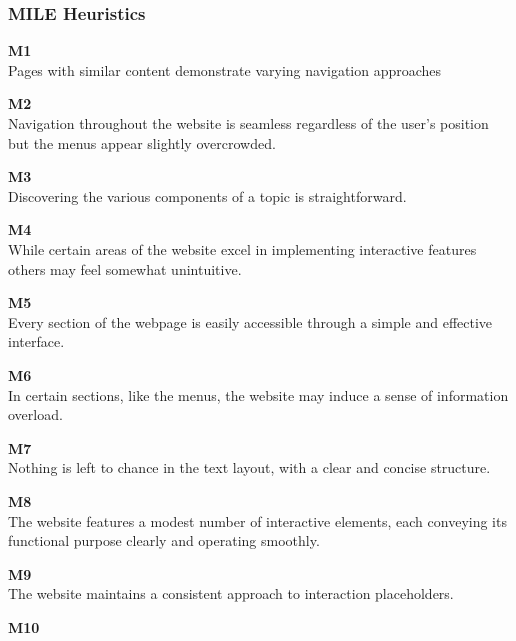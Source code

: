 \subsubsection{MILE Heuristics}
\begin{description}
    \item {\textbf{M1} \color{unicefGray}{Interaction consistency}}\\
    Pages with similar content demonstrate varying navigation approaches
    \item {\textbf{M2} \color{unicefGray}{Group navigation}}\\
    Navigation throughout the website is seamless regardless of the user's position but the menus appear slightly overcrowded.
    \item {\textbf{M3} \color{unicefGray}{Navigation support}}\\
    Discovering the various components of a topic is straightforward.
    \item {\textbf{M4} \color{unicefGray}{User control}}\\
    While certain areas of the website excel in implementing interactive features others may feel somewhat unintuitive.
    \item {\textbf{M5} \color{unicefGray}{Error prevention}}\\
    Every section of the webpage is easily accessible through a simple and effective interface.
    \item {\textbf{M6} \color{unicefGray}{Information overload}}\\
    In certain sections, like the menus, the website may induce a sense of information overload.
    \item {\textbf{M7} \color{unicefGray}{Text layout}}\\
    Nothing is left to chance in the text layout, with a clear and concise structure.
    \item {\textbf{M8} \color{unicefGray}{Interaction placeholder semiotics}}\\
    The website features a modest number of interactive elements, each conveying its functional purpose clearly and operating smoothly.
    \item {\textbf{M9} \color{unicefGray}{Interaction placeholder consistency}}\\
    The website maintains a consistent approach to interaction placeholders.
    \item {\textbf{M10} \color{unicefGray}{Spatial allocation}}\\

\end{description}
